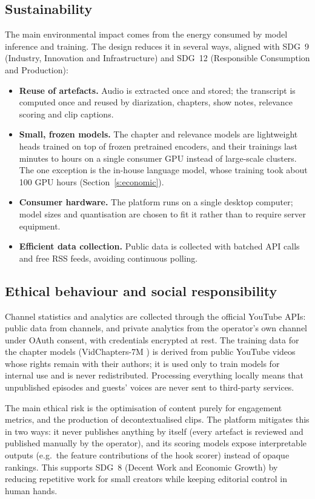 \documentclass[ENG]{TFUOC}
\begin{document}
\subsection*{Sustainability}

The main environmental impact comes from the energy consumed by model inference and training. The design reduces it in several ways, aligned with SDG~9 (Industry, Innovation and Infrastructure) and SDG~12 (Responsible Consumption and Production):
\begin{itemize}
\item \textbf{Reuse of artefacts.} Audio is extracted once and stored; the transcript is computed once and reused by diarization, chapters, show notes, relevance scoring and clip captions.
\item \textbf{Small, frozen models.} The chapter and relevance models are lightweight heads trained on top of frozen pretrained encoders, and their trainings last minutes to hours on a single consumer GPU instead of large-scale clusters. The one exception is the in-house language model, whose training took about 100 GPU hours (Section~\ref{s:economic}).
\item \textbf{Consumer hardware.} The platform runs on a single desktop computer; model sizes and quantisation are chosen to fit it rather than to require server equipment.
\item \textbf{Efficient data collection.} Public data is collected with batched API calls and free RSS feeds, avoiding continuous polling.
\end{itemize}

\subsection*{Ethical behaviour and social responsibility}

Channel statistics and analytics are collected through the official YouTube APIs: public data from channels, and private analytics from the operator's own channel under OAuth consent, with credentials encrypted at rest. The training data for the chapter models (VidChapters-7M \cite{yang2023vidchapters}) is derived from public YouTube videos whose rights remain with their authors; it is used only to train models for internal use and is never redistributed. Processing everything locally means that unpublished episodes and guests' voices are never sent to third-party services.

The main ethical risk is the optimisation of content purely for engagement metrics, and the production of decontextualised clips. The platform mitigates this in two ways: it never publishes anything by itself (every artefact is reviewed and published manually by the operator), and its scoring models expose interpretable outputs (e.g.\ the feature contributions of the hook scorer) instead of opaque rankings. This supports SDG~8 (Decent Work and Economic Growth) by reducing repetitive work for small creators while keeping editorial control in human hands.
\end{document}
